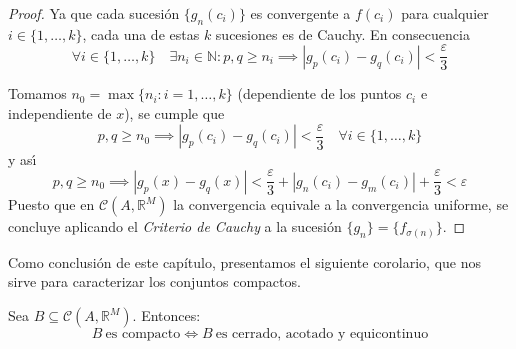 \begin{proof}
    Ya que cada sucesi\'on $\{ g_n(c_i)\}$ es convergente a $f(c_i)$
    para cualquier $i \in \{ 1,\dots ,k\}$, cada una de estas $k$
    sucesiones es de Cauchy. En consecuencia
    \[\forall i \in \{ 1,\dots ,k\} \quad \exists n_i \in \mathbb{N} :
    p,q \geq n_i \implies |g_p(c_i) - g_q(c_i)| <
    \frac{\varepsilon}{3}\]

  Tomamos $n_0 = \max\{n_i: i = 1,\ldots, k\}$ ({dependiente de
    los puntos $c_i$ e independiente de $x$}), se cumple que
    \[
      p,q \geq n_0 \implies |g_p(c_i)-g_q(c_i)| <\frac{\varepsilon}{3}
      \quad \forall i\in \{ 1,\dots ,k\}
    \]
    y as\'{\i}
    \[
      p,q \geq n_0 \implies |g_p(x)-g_q(x)| <\frac{\varepsilon}{3}
      +|g_n(c_i)-g_m(c_i)| + \frac{\varepsilon}{3} <\varepsilon
    \]
    Puesto que en $\mathcal{C}(A,\mathbb R^M )$ la convergencia
    equivale a la convergencia uniforme, se concluye aplicando el
    \textit{Criterio de Cauchy} a la sucesión
    $\{g_n\} = \{f_{\sigma(n)}\}$.
  \end{proof}

Como conclusión de este capítulo, presentamos el siguiente corolario, que nos sirve para caracterizar los conjuntos compactos.

\begin{ncor} Sea $B \subseteq \mathcal{C}(A,\mathbb{R}^M)$. Entonces: $$B\ \text{es compacto} \iff B \ \text{es cerrado, acotado y equicontinuo}$$
\end{ncor}

